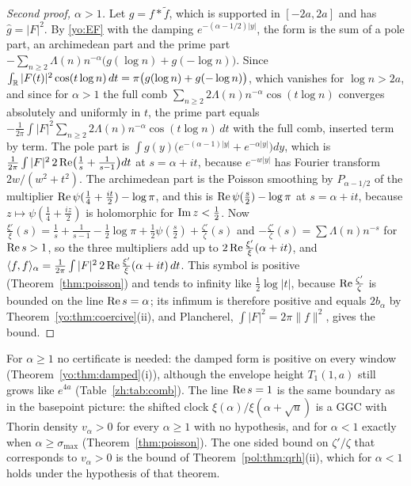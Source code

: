 \begin{proof}[Second proof, $\alpha>1$]
Let $g=f*\widetilde f$, which is supported in $[-2a,2a]$ and has $\widehat g=|F|^2$. By \eqref{yo:EF} with the damping $e^{-(\alpha-1/2)|y|}$, the form is the sum of a pole part, an archimedean part and the prime part $-\sum_{n\ge2}\Lambda(n)n^{-\alpha}\bigl(g(\log n)+g(-\log n)\bigr)$. Since $\int_{\mathbb{R}}|F(t)|^2\cos(t\log n)\,dt=\pi\bigl(g(\log n)+g(-\log n)\bigr)$, which vanishes for $\log n>2a$, and since for $\alpha>1$ the full comb $\sum_{n\ge2}2\Lambda(n)n^{-\alpha}\cos(t\log n)$ converges absolutely and uniformly in $t$, the prime part equals $-\frac1{2\pi}\int|F|^2\sum_{n\ge2}2\Lambda(n)n^{-\alpha}\cos(t\log n)\,dt$ with the full comb, inserted term by term. The pole part is $\int g(y)\bigl(e^{-(\alpha-1)|y|}+e^{-\alpha|y|}\bigr)dy$, which is $\frac1{2\pi}\int|F|^2\,2\operatorname{Re}\bigl(\frac1s+\frac1{s-1}\bigr)dt$ at $s=\alpha+it$, because $e^{-w|y|}$ has Fourier transform $2w/(w^2+t^2)$. The archimedean part is the Poisson smoothing by $P_{\alpha-1/2}$ of the multiplier $\operatorname{Re}\psi(\frac14+\frac{it}2)-\log\pi$, and this is $\operatorname{Re}\psi(\frac s2)-\log\pi$ at $s=\alpha+it$, because $z\mapsto\psi(\frac14+\frac{iz}2)$ is holomorphic for $\operatorname{Im} z<\frac12$. Now $\frac{\xi'}\xi(s)=\frac1s+\frac1{s-1}-\frac12\log\pi+\frac12\psi(\frac s2)+\frac{\zeta'}\zeta(s)$ and $-\frac{\zeta'}\zeta(s)=\sum\Lambda(n)n^{-s}$ for $\operatorname{Re} s>1$, so the three multipliers add up to $2\operatorname{Re}\frac{\xi'}\xi(\alpha+it)$, and $\langle f,f\rangle_\alpha=\frac1{2\pi}\int|F|^2\,2\operatorname{Re}\frac{\xi'}\xi(\alpha+it)\,dt$. This symbol is positive (Theorem~\ref{thm:poisson}) and tends to infinity like $\frac12\log|t|$, because $\operatorname{Re}\frac{\zeta'}\zeta$ is bounded on the line $\operatorname{Re} s=\alpha$; its infimum is therefore positive and equals $2b_\alpha$ by Theorem~\ref{yo:thm:coercive}(ii), and Plancherel, $\int|F|^2=2\pi\|f\|^2$, gives the bound.
\end{proof}

For $\alpha\ge1$ no certificate is needed: the damped form is positive on every window (Theorem~\ref{yo:thm:damped}(i)), although the envelope height $T_1(1,a)$ still grows like $e^{4a}$ (Table~\ref{zh:tab:comb}). The line $\operatorname{Re} s=1$ is the same boundary as in the basepoint picture: the shifted clock $\xi(\alpha)/\xi(\alpha+\sqrt u)$ is a GGC with Thorin density $v_\alpha>0$ for every $\alpha\ge1$ with no hypothesis, and for $\alpha<1$ exactly when $\alpha\ge\sigma_{\max}$ (Theorem~\ref{thm:poisson}). The one sided bound on $\zeta'/\zeta$ that corresponds to $v_\alpha>0$ is the bound of Theorem~\ref{pol:thm:qrh}(ii), which for $\alpha<1$ holds under the hypothesis of that theorem.

